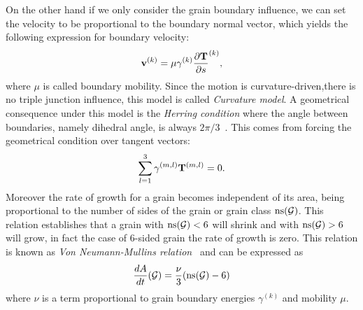 On the other hand if we only consider the grain boundary influence, we can set the velocity to be proportional to the boundary normal vector, which yields the following expression for boundary velocity:
\begin{equation*}
    \mathbf{v}^{(k)} = \mu \gamma^{(k)} \dfrac{\partial \mathbf{T}}{\partial s}^{(k)},
\end{equation*}
where $\mu$ is called boundary mobility. 
Since the motion is curvature-driven,\ie there is no triple junction influence, this model is called \emph{Curvature model}. 
A geometrical consequence under this model is the \emph{Herring condition} where the angle between boundaries, namely dihedral angle, is always $2\pi/3$~\cite{herring1951surface}. 
This comes from forcing the geometrical condition over tangent vectors:
\begin{equation}
    \sum_{l=1}^{3}\gamma^{(m,l)}\mathbf{T}^{(m,l)} = 0.
\end{equation}
Moreover the rate of growth for a grain becomes independent of its area, 
being proportional to the number of sides of the grain or grain class $\operatorname{ns}(\mathcal{G})$. 
This relation establishes that a grain with $\operatorname{ns}(\mathcal{G}) < 6$ will shrink and with $\operatorname{ns}(\mathcal{G}) > 6$ will grow, in fact the case of 6-sided grain the rate of growth is zero. 
This relation is known as \emph{Von Neumann-Mullins relation}~\cite{mullins1956two} and can be expressed as
\begin{equation}
    \frac{dA}{dt}(\mathcal{G}) = \frac{\nu}{3}(\operatorname{ns}(\mathcal{G})-6)
    \label{eq:vonneumann-mullins}
\end{equation}
where $\nu$ is a term proportional to grain boundary energies $\gamma^{(k)}$ and mobility $\mu$. 
